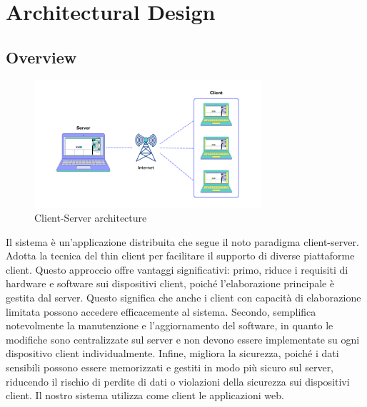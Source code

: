 \section{Architectural Design}
\subsection{Overview}

\begin{figure}[H]
    \centering
    \includegraphics[width=0.75\textwidth]{Design/client-server-architecture-1024x576.png}
    \caption{Client-Server architecture}
    \label{fig:enter-label}
\end{figure}
Il sistema è un'applicazione distribuita che segue il noto paradigma client-server. Adotta la tecnica del thin client per facilitare il supporto di diverse piattaforme client. Questo approccio offre vantaggi significativi: primo, riduce i requisiti di hardware e software sui dispositivi client, poiché l'elaborazione principale è gestita dal server. Questo significa che anche i client con capacità di elaborazione limitata possono accedere efficacemente al sistema. Secondo, semplifica notevolmente la manutenzione e l'aggiornamento del software, in quanto le modifiche sono centralizzate sul server e non devono essere implementate su ogni dispositivo client individualmente. Infine, migliora la sicurezza, poiché i dati sensibili possono essere memorizzati e gestiti in modo più sicuro sul server, riducendo il rischio di perdite di dati o violazioni della sicurezza sui dispositivi client. Il nostro sistema utilizza come client le applicazioni web.

